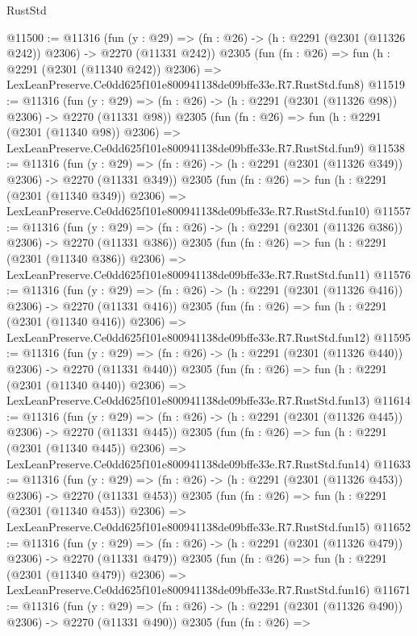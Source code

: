 \begin{lexlean}{RustStd}
\begin{coremodule}
@11500 := @11316
    (fun (y : @29) => (fn : @26) -> (h : @2291 (@2301 (@11326 @242)) @2306) -> @2270 (@11331 @242))
    @2305
    (fun (fn : @26) =>
    fun (h : @2291 (@2301 (@11340 @242)) @2306) =>
    LexLeanPreserve.Ce0dd625f101e800941138de09bffe33e.R7.RustStd.fun8)
@11519 := @11316
    (fun (y : @29) => (fn : @26) -> (h : @2291 (@2301 (@11326 @98)) @2306) -> @2270 (@11331 @98))
    @2305
    (fun (fn : @26) =>
    fun (h : @2291 (@2301 (@11340 @98)) @2306) =>
    LexLeanPreserve.Ce0dd625f101e800941138de09bffe33e.R7.RustStd.fun9)
@11538 := @11316
    (fun (y : @29) => (fn : @26) -> (h : @2291 (@2301 (@11326 @349)) @2306) -> @2270 (@11331 @349))
    @2305
    (fun (fn : @26) =>
    fun (h : @2291 (@2301 (@11340 @349)) @2306) =>
    LexLeanPreserve.Ce0dd625f101e800941138de09bffe33e.R7.RustStd.fun10)
@11557 := @11316
    (fun (y : @29) => (fn : @26) -> (h : @2291 (@2301 (@11326 @386)) @2306) -> @2270 (@11331 @386))
    @2305
    (fun (fn : @26) =>
    fun (h : @2291 (@2301 (@11340 @386)) @2306) =>
    LexLeanPreserve.Ce0dd625f101e800941138de09bffe33e.R7.RustStd.fun11)
@11576 := @11316
    (fun (y : @29) => (fn : @26) -> (h : @2291 (@2301 (@11326 @416)) @2306) -> @2270 (@11331 @416))
    @2305
    (fun (fn : @26) =>
    fun (h : @2291 (@2301 (@11340 @416)) @2306) =>
    LexLeanPreserve.Ce0dd625f101e800941138de09bffe33e.R7.RustStd.fun12)
@11595 := @11316
    (fun (y : @29) => (fn : @26) -> (h : @2291 (@2301 (@11326 @440)) @2306) -> @2270 (@11331 @440))
    @2305
    (fun (fn : @26) =>
    fun (h : @2291 (@2301 (@11340 @440)) @2306) =>
    LexLeanPreserve.Ce0dd625f101e800941138de09bffe33e.R7.RustStd.fun13)
@11614 := @11316
    (fun (y : @29) => (fn : @26) -> (h : @2291 (@2301 (@11326 @445)) @2306) -> @2270 (@11331 @445))
    @2305
    (fun (fn : @26) =>
    fun (h : @2291 (@2301 (@11340 @445)) @2306) =>
    LexLeanPreserve.Ce0dd625f101e800941138de09bffe33e.R7.RustStd.fun14)
@11633 := @11316
    (fun (y : @29) => (fn : @26) -> (h : @2291 (@2301 (@11326 @453)) @2306) -> @2270 (@11331 @453))
    @2305
    (fun (fn : @26) =>
    fun (h : @2291 (@2301 (@11340 @453)) @2306) =>
    LexLeanPreserve.Ce0dd625f101e800941138de09bffe33e.R7.RustStd.fun15)
@11652 := @11316
    (fun (y : @29) => (fn : @26) -> (h : @2291 (@2301 (@11326 @479)) @2306) -> @2270 (@11331 @479))
    @2305
    (fun (fn : @26) =>
    fun (h : @2291 (@2301 (@11340 @479)) @2306) =>
    LexLeanPreserve.Ce0dd625f101e800941138de09bffe33e.R7.RustStd.fun16)
@11671 := @11316
    (fun (y : @29) => (fn : @26) -> (h : @2291 (@2301 (@11326 @490)) @2306) -> @2270 (@11331 @490))
    @2305
    (fun (fn : @26) =>

\end{coremodule}
\end{lexlean}
